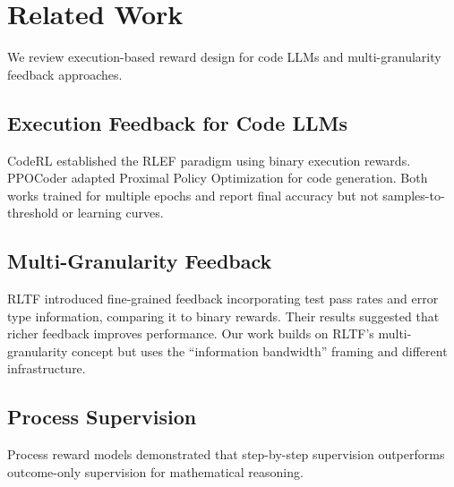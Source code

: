 \section{Related Work}

We review execution-based reward design for code LLMs and multi-granularity feedback approaches.

\subsection{Execution Feedback for Code LLMs}

CodeRL \citep{le2022coderl} established the RLEF paradigm using binary execution rewards. PPOCoder \citep{shojaee2023ppocoder} adapted Proximal Policy Optimization for code generation. Both works trained for multiple epochs and report final accuracy but not samples-to-threshold or learning curves.

\subsection{Multi-Granularity Feedback}

RLTF \citep{liu2023rltf} introduced fine-grained feedback incorporating test pass rates and error type information, comparing it to binary rewards. Their results suggested that richer feedback improves performance. Our work builds on RLTF's multi-granularity concept but uses the ``information bandwidth'' framing and different infrastructure.

\subsection{Process Supervision}

Process reward models \citep{lightman2023verify} demonstrated that step-by-step supervision outperforms outcome-only supervision for mathematical reasoning.
